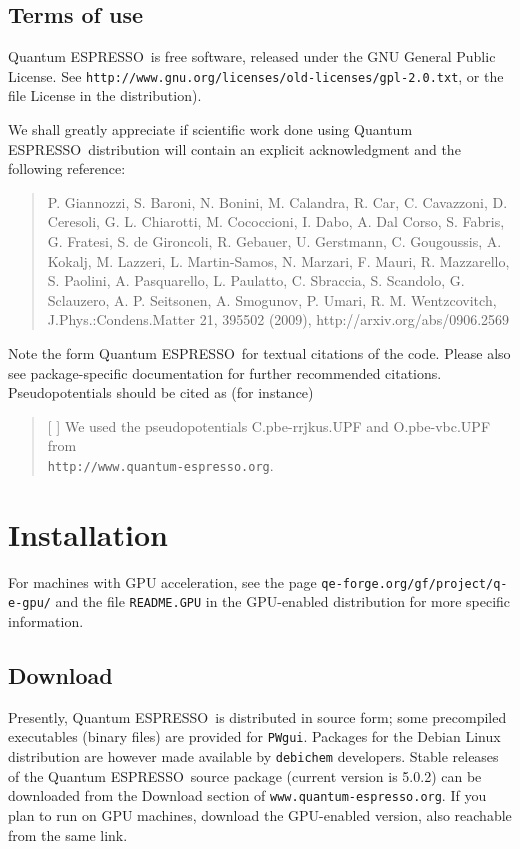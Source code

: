 \documentclass[12pt,a4paper]{article}
\def\version{5.0.2}
\def\qe{{\sc Quantum ESPRESSO}}
\begin{document}
\subsection{Terms of use}
\label{SubSec:Terms}

\qe\ is free software, released under the 
GNU General Public License. See
\texttt{http://www.gnu.org/licenses/old-licenses/gpl-2.0.txt}, 
or the file License in the distribution).
    
We shall greatly appreciate if scientific work done using \qe\ distribution will 
contain an explicit acknowledgment and the following reference:
\begin{quote}
P. Giannozzi, S. Baroni, N. Bonini, M. Calandra, R. Car, C. Cavazzoni,
D. Ceresoli, G. L. Chiarotti, M. Cococcioni, I. Dabo, A. Dal Corso,
S. Fabris, G. Fratesi, S. de Gironcoli, R. Gebauer, U. Gerstmann,
C. Gougoussis, A. Kokalj, M. Lazzeri, L. Martin-Samos, N. Marzari,
F. Mauri, R. Mazzarello, S. Paolini, A. Pasquarello, L. Paulatto,
C. Sbraccia, S. Scandolo, G. Sclauzero, A. P. Seitsonen, A. Smogunov,
P. Umari, R. M. Wentzcovitch, J.Phys.:Condens.Matter 21, 395502 (2009),
http://arxiv.org/abs/0906.2569
\end{quote}
Note the form \qe\ for textual citations of the code.
Please also see package-specific documentation for
further recommended citations.
Pseudopotentials should be cited as (for instance)
\begin{quote}
[ ] We used the pseudopotentials C.pbe-rrjkus.UPF
and O.pbe-vbc.UPF from\\
\texttt{http://www.quantum-espresso.org}.
\end{quote}
\section{Installation}

For machines with GPU acceleration, see the page
\texttt{qe-forge.org/gf/project/q-e-gpu/} and the
file \texttt{README.GPU} in the GPU-enabled distribution
for more specific information.

\subsection{Download}
\label{SubSec:Download}
 
Presently, \qe\ is distributed in source form; some precompiled 
executables (binary files) are provided for \texttt{PWgui}.
Packages for the Debian Linux distribution are however 
made available by \texttt{debichem} developers.
Stable releases of the \qe\ source package (current version 
is \version) can be downloaded from the Download section
of \texttt{www.quantum-espresso.org}. If you plan to run
on GPU machines, download the GPU-enabled version, also reachable 
from the same link. 
\end{document}
